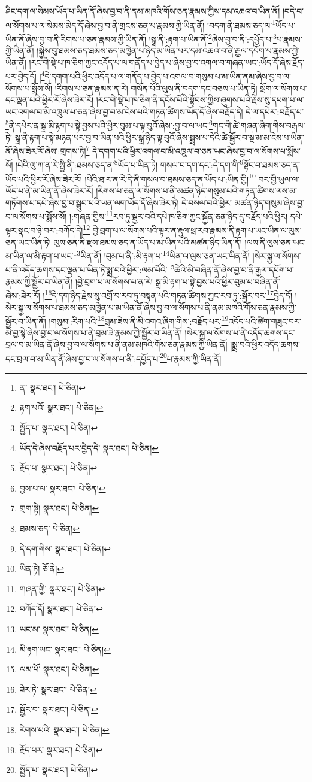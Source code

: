 ཤིང་དག་ལ་སེམས་ཡོད་པ་ཡིན་ནོ་ཞེས་བྱ་བ་ནི་ནམ་མཁའི་གོས་ཅན་རྣམས་ཀྱིས་དམ་འཆའ་བ་ཡིན་ནོ། །བདེ་བ་ལ་སོགས་པ་ལ་སེམས་མེད་དོ་ཞེས་བྱ་བ་ནི་གྲངས་ཅན་པ་རྣམས་ཀྱི་ཡིན་ནོ། །བདག་ནི་ཐམས་ཅད་ལ་\footnote{ན་  སྣར་ཐང་།  པེ་ཅིན། }ཡོད་པ་ཡིན་ནོ་ཞེས་བྱ་བ་ནི་རིགས་པ་ཅན་རྣམས་ཀྱི་ཡིན་ནོ། །སྒྲ་ནི་:རྟག་པ་ཡིན་ནོ་\footnote{རྟག་པའོ་  སྣར་ཐང་།  པེ་ཅིན། }ཞེས་བྱ་བ་ནི་:དཔྱོད་པ་\footnote{སྤྱོད་པ་  སྣར་ཐང་།  པེ་ཅིན། }པ་རྣམས་ཀྱི་ཡིན་ནོ། །སྐྱེས་བུ་ཐམས་ཅད་ཐམས་ཅད་མཁྱེན་པ་ཉིད་མ་ཡིན་པར་དམ་འཆའ་བ་ནི་རྒྱལ་དཔོག་པ་རྣམས་ཀྱི་ཡིན་ནོ། །རང་གི་སྡེ་པ་ཁ་ཅིག་ཀྱང་འདོད་པ་ལ་གནོད་པ་བྱེད་པ་ཞེས་བྱ་བ་འགལ་བ་གཞན་ཡང་:ཡོད་དོ་ཞེས་རྗོད་པར་བྱེད་དོ། །\footnote{ཡོད་དེ་ཞེས་བརྗོད་པར་བྱེད་དེ་  སྣར་ཐང་།  པེ་ཅིན། }དེ་དགག་པའི་ཕྱིར་འདོད་པ་ལ་གནོད་པ་བྱེད་པ་འགལ་བ་གསུམ་པ་མ་ཡིན་ནམ་ཞེས་བྱ་བ་ལ་སོགས་པ་སྨོས་སོ། །རིགས་པ་ཅན་རྣམས་ན་རེ། གསོན་པོའི་ལུས་ནི་བདག་དང་བཅས་པ་ཡིན་ཏེ། སྲོག་ལ་སོགས་པ་དང་ལྡན་པའི་ཕྱིར་རོ་ཞེས་ཟེར་རོ། །རང་གི་སྡེ་པ་ཁ་ཅིག་ནི་དངོས་པོའི་སྟོབས་ཀྱིས་ཞུགས་པའི་རྗེས་སུ་དཔག་པ་ལ་ཡང་འགལ་བ་མི་འཁྲུལ་པ་ཅན་ཞེས་བྱ་བ་མ་ངེས་པའི་གཏན་ཚིགས་ཡོད་དོ་ཞེས་བརྗོད་དེ། དེ་ལ་དཔེར་:བརྗོད་པ་\footnote{རྗོད་པ་  སྣར་ཐང་།  པེ་ཅིན། }ནི་དཔེར་ན་སྒྲ་མི་རྟག་པ་སྟེ་བྱས་པའི་ཕྱིར་བུམ་པ་ལྟ་བུའོ་ཞེས་:བྱ་བ་ལ་ཡང་\footnote{བྱས་པ་ལ་  སྣར་ཐང་།  པེ་ཅིན། }གང་གི་ཚེ་གཞན་ཞིག་གིས་བརྒལ་ཏེ། སྒྲ་ནི་རྟག་པ་སྟེ་མཉན་པར་བྱ་བ་ཡིན་པའི་ཕྱིར་སྒྲ་ཉིད་ལྟ་བུའོ་ཞེས་སྨྲས་པ་དེའི་ཚེ་སྦྱོར་བ་སྔ་མ་མ་ངེས་པ་ཡིན་ནོ་ཞེས་ཟེར་རོ་ཞེས་:གྲགས་ཏེ།\footnote{གྲག་སྟེ།  སྣར་ཐང་།  པེ་ཅིན། } དེ་དགག་པའི་ཕྱིར་འགལ་བ་མི་འཁྲུལ་བ་ཅན་ཡང་ཞེས་བྱ་བ་ལ་སོགས་པ་སྨོས་སོ། །པེའི་ལུ་ཀ་ན་རེ་སྤྱི་ནི་:ཐམས་ཅད་ན་\footnote{ཐམས་ཅད་  པེ་ཅིན། }ཡོད་པ་ཡིན་ཏེ། གསལ་བ་དག་དང་:དེ་དག་གི་\footnote{དེ་དག་གིས་  སྣར་ཐང་།  པེ་ཅིན། }སྟོང་བ་ཐམས་ཅད་ན་ཡོད་པའི་ཕྱིར་རོ་ཞེས་ཟེར་རོ། །པེའི་ཐ་ར་ན་རེ་དེ་ནི་གསལ་བ་ཐམས་ཅད་ན་ཡོད་པ་:ཡིན་གྱི།\footnote{ཡིན་ཏེ།  ཅོ་ནེ། } བར་གྱི་ཡུལ་ལ་ཡོད་པ་ནི་མ་ཡིན་ནོ་ཞེས་ཟེར་རོ། །རིགས་པ་ཅན་ལ་སོགས་པ་ནི་མཚན་ཉིད་གསུམ་པའི་གཏན་ཚིགས་ལས་མ་གཏོགས་པ་དཔེ་ཞེས་བྱ་བ་སྒྲུབ་པའི་ཡན་ལག་ཡོད་དོ་ཞེས་ཟེར་ཏེ། དེ་བསལ་བའི་ཕྱིར། མཚན་ཉིད་གསུམ་ཞེས་བྱ་བ་ལ་སོགས་པ་སྨོས་སོ། །:གཞན་གྱིས་\footnote{གཞན་གྱི་  སྣར་ཐང་།  པེ་ཅིན། }རབ་ཏུ་སྦྱར་བའི་དཔེ་ཁ་ཅིག་ཀྱང་སྐྱོན་ཅན་ཉིད་དུ་བརྗོད་པའི་ཕྱིར། དཔེ་ལྟར་སྣང་བ་ཉེ་བར་:བཀོད་དེ།\footnote{བཀོད་དོ།  སྣར་ཐང་།  པེ་ཅིན། } བྱེ་བྲག་པ་ལ་སོགས་པའི་ལྟར་ན་རྡུལ་ཕྲ་རབ་རྣམས་ནི་རྟག་པ་ཡང་ཡིན་ལ་ལུས་ཅན་ཡང་ཡིན་ཏེ། ལུས་ཅན་ནི་རྫས་ཐམས་ཅད་ན་ཡོད་པ་མ་ཡིན་པའི་མཚན་ཉིད་ཡིན་ནོ། །ལས་ནི་ལུས་ཅན་ཡང་མ་ཡིན་ལ་མི་རྟག་པ་ཡང་\footnote{ཡང་མ་  སྣར་ཐང་།  པེ་ཅིན། }ཡིན་ནོ། །བུམ་པ་ནི་:མི་རྟག་པ་\footnote{མི་རྟག་ཡང་  སྣར་ཐང་།  པེ་ཅིན། }ཡིན་ལ་ལུས་ཅན་ཡང་ཡིན་ནོ། །སེར་སྐྱ་ལ་སོགས་པ་ནི་འདོད་ཆགས་དང་ལྡན་པ་ཡིན་ཏེ་སྨྲ་བའི་ཕྱིར་:ལམ་པོའི་\footnote{ལམ་པོ་  སྣར་ཐང་།  པེ་ཅིན། }ཆེའི་མི་བཞིན་ནོ་ཞེས་བྱ་བ་ནི་རྒྱལ་དཔོག་པ་རྣམས་ཀྱི་སྦྱོར་བ་ཡིན་ནོ། །བྱེ་བྲག་པ་ལ་སོགས་པ་ན་རེ། སྒྲ་མི་རྟག་པ་སྟེ་བྱས་པའི་ཕྱིར་བུམ་པ་བཞིན་ནོ་ཞེས་:ཟེར་རོ། །\footnote{ཟེར་ཏེ་  སྣར་ཐང་།  པེ་ཅིན། }དེ་དག་ཉིད་རྗེས་སུ་འགྲོ་བ་རབ་ཏུ་བསྟན་པའི་གཏན་ཚིགས་ཀྱང་རབ་ཏུ་:སྦྱོར་བར་\footnote{སྦྱོར་བ་  སྣར་ཐང་།  པེ་ཅིན། }བྱེད་དོ། །སེར་སྐྱ་ལ་སོགས་པ་ཐམས་ཅད་མཁྱེན་པ་མ་ཡིན་ནོ་ཞེས་བྱ་བ་ལ་སོགས་པ་ནི་ནམ་མཁའི་གོས་ཅན་རྣམས་ཀྱི་སྦྱོར་བ་ཡིན་ནོ། །གསུམ་:རིག་པའི་\footnote{རིགས་པའི་  སྣར་ཐང་།  པེ་ཅིན། }བྲམ་ཟེས་ནི་མི་འགའ་ཞིག་གིས་:བརྗོད་པར་\footnote{རྗོད་པར་  སྣར་ཐང་།  པེ་ཅིན། }འདོད་པའི་ཚིག་གཟུང་བར་མི་བྱ་སྟེ་ཞེས་བྱ་བ་ལ་སོགས་པ་ནི་བྲམ་ཟེ་རྣམས་ཀྱི་སྦྱོར་བ་ཡིན་ནོ། །སེར་སྐྱ་ལ་སོགས་པ་ནི་འདོད་ཆགས་དང་བྲལ་བ་མ་ཡིན་ནོ་ཞེས་བྱ་བ་ལ་སོགས་པ་ནི་ནམ་མཁའི་གོས་ཅན་རྣམས་ཀྱི་ཡིན་ནོ། །སྨྲ་བའི་ཕྱིར་འདོད་ཆགས་དང་བྲལ་བ་མ་ཡིན་ནོ་ཞེས་བྱ་བ་ལ་སོགས་པ་ནི་:དཔྱོད་པ་\footnote{སྤྱོད་པ་  སྣར་ཐང་།  པེ་ཅིན། }པ་རྣམས་ཀྱི་ཡིན་ནོ། 